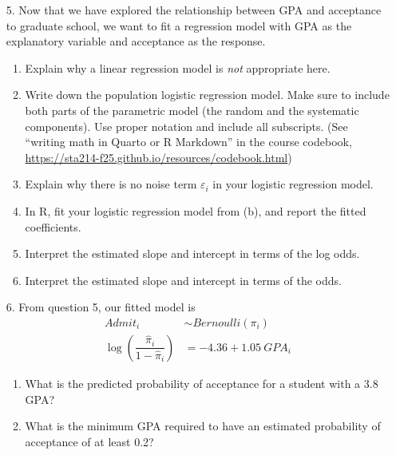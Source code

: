 \documentclass[11pt]{article}
\begin{document}
\begin{enumerate}
\item[5.] Now that we have explored the relationship between GPA and acceptance to graduate school, we want to fit a regression model with GPA as the explanatory variable and acceptance as the response.

\begin{enumerate}
\item Explain why a linear regression model is \textit{not} appropriate here.

\item Write down the population logistic regression model. Make sure to include both parts of the parametric model (the random and the systematic components). Use proper notation and include all subscripts. (See ``writing math in Quarto or R Markdown'' in the course codebook, \url{https://sta214-f25.github.io/resources/codebook.html})

\item Explain why there is no noise term $\varepsilon_i$ in your logistic regression model.

\item In R, fit your logistic regression model from (b), and report the fitted coefficients.

\item Interpret the estimated slope and intercept in terms of the log odds.

\item Interpret the estimated slope and intercept in terms of the odds.
\end{enumerate}

\item[6.] From question 5, our fitted model is
\begin{align*}
Admit_i &\sim Bernoulli(\pi_i) \\
\log \left( \dfrac{\widehat{\pi}_i}{1 - \widehat{\pi}_i} \right) &= -4.36 + 1.05 \ GPA_i
\end{align*}

\begin{enumerate}
\item What is the predicted probability of acceptance for a student with a 3.8 GPA?

\item What is the minimum GPA required to have an estimated probability of acceptance of at least 0.2?
\end{enumerate}
\end{enumerate}
\end{document}
